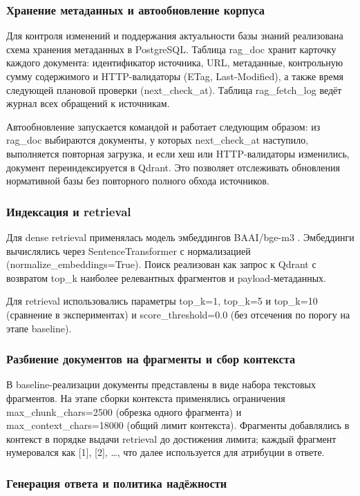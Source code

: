 \documentclass[a4paper,12pt]{article}
\begin{document}
\subsubsection{Хранение метаданных и автообновление корпуса}

Для контроля изменений и поддержания актуальности базы знаний реализована схема хранения метаданных в PostgreSQL. Таблица rag\_doc хранит карточку каждого документа: идентификатор источника, URL, метаданные, контрольную сумму содержимого и HTTP-валидаторы (ETag, Last-Modified), а также время следующей плановой проверки (next\_check\_at). Таблица rag\_fetch\_log ведёт журнал всех обращений к источникам.

Автообновление запускается командой и работает следующим образом: из rag\_doc выбираются документы, у которых next\_check\_at наступило, выполняется повторная загрузка, и если хеш или HTTP-валидаторы изменились, документ переиндексируется в Qdrant. Это позволяет отслеживать обновления нормативной базы без повторного полного обхода источников.

\subsubsection{Индексация и retrieval}

Для dense retrieval применялась модель эмбеддингов BAAI/bge-m3 \cite{m3embedding2024}. Эмбеддинги вычислялись через SentenceTransformer с нормализацией (normalize\_embeddings=True). Поиск реализован как запрос к Qdrant с возвратом top\_k наиболее релевантных фрагментов и payload-метаданных.

Для retrieval использовались параметры top\_k=1, top\_k=5 и top\_k=10 (сравнение в экспериментах) и score\_threshold=0.0 (без отсечения по порогу на этапе baseline).

\subsubsection{Разбиение документов на фрагменты и сбор контекста}

В baseline-реализации документы представлены в виде набора текстовых фрагментов. На этапе сборки контекста применялись ограничения max\_chunk\_chars=2500 (обрезка одного фрагмента) и max\_context\_chars=18000 (общий лимит контекста). Фрагменты добавлялись в контекст в порядке выдачи retrieval до достижения лимита; каждый фрагмент нумеровался как [1], [2], \dots, что далее используется для атрибуции в ответе.

\subsubsection{Генерация ответа и политика надёжности}
\end{document}
